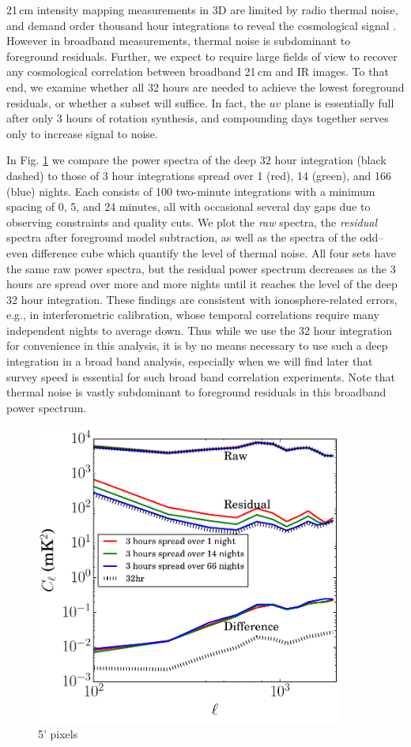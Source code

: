 \documentclass[preprint]{aastex}
\begin{document}
21\,cm intensity mapping measurements in 3D are limited by radio thermal noise, and demand order thousand hour integrations to reveal the cosmological signal \citep{beardsley13,PoberNextGen}. However in broadband measurements, thermal noise is subdominant to foreground residuals. Further, we expect to require large fields of view to recover any cosmological correlation between broadband 21\,cm and IR images. To that end, we examine whether all 32 hours are needed to achieve the lowest foreground residuals, or whether a subset will suffice. In fact, the $uv$ plane is essentially full after only 3 hours of rotation synthesis, and compounding days together serves only to increase signal to noise. 

In Fig. \ref{fig:respspecspacingsstudy} we compare the power spectra of the deep 32 hour integration (black dashed) to those of 3 hour integrations spread over 1 (red), 14 (green), and 166 (blue) nights. Each consists of 100 two-minute integrations with a minimum spacing of 0, 5, and 24 minutes, all with occasional several day gaps due to observing constraints and quality cuts. We plot the \textit{raw} spectra, the \textit{residual} spectra after foreground model subtraction, as well as the spectra of the odd--even difference cube which quantify the level of thermal noise. All four sets have the same raw power spectra, but the residual power spectrum decreases as the 3 hours are spread over more and more nights until it reaches the level of the deep 32 hour integration. These findings are consistent with ionosphere-related errors, e.g., in interferometric calibration, whose temporal correlations require many independent nights to average down. Thus while we use the 32 hour integration for convenience in this analysis, it is by no means necessary to use such a deep integration in a broad band analysis, especially when we will find later that survey speed is essential for such broad band correlation experiments. Note that thermal noise is vastly subdominant to foreground residuals in this broadband power spectrum.

\begin{figure}[h]
\centering
\includegraphics[width=4in]{images/res_pspec_of_100_obsids_with_diff_spacings.pdf}
\caption{5' pixels}
\label{fig:respspecspacingsstudy}
\end{figure}
\end{document}
